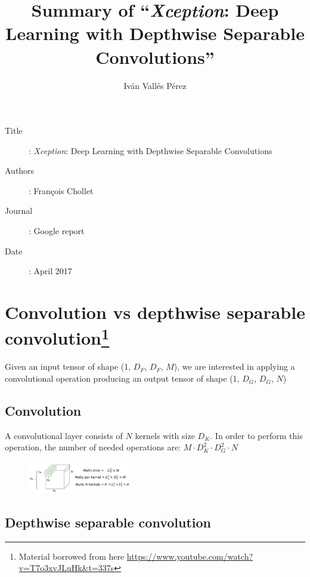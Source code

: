 \documentclass[10pt,a4paper]{article}
\title{Summary of ``\textit{Xception}: Deep Learning with Depthwise Separable Convolutions''}
\date{\vspace{-5ex}}
\author{Iván Vallés Pérez}
\begin{document}
\maketitle

\begin{description}
	\item[Title]: \textit{Xception}: Deep Learning with Depthwise Separable Convolutions
	\item[Authors]: François Chollet
	\item[Journal]: Google report
	\item[Date]: April 2017
\end{description}

\section*{Convolution vs depthwise separable convolution\footnote{Material borrowed from here \url{https://www.youtube.com/watch?v=T7o3xvJLuHk&t=337s}}}
Given an input tensor of shape (1, $D_F$, $D_F$, $M$), we are interested in applying a convolutional operation producing an output tensor of shape (1, $D_G$, $D_G$, $N$)

\subsection*{Convolution}
A convolutional layer consists of $N$ kernels with size $D_K$. In order to perform this operation, the number of needed operations are: $M \cdot D_K^2 \cdot D_G^2 \cdot N$

\begin{figure}[h!]
	\centering
	\includegraphics[width=0.4\textwidth]{img/conv_ops.png}
\end{figure}

\subsection*{Depthwise separable convolution}
\end{document}
